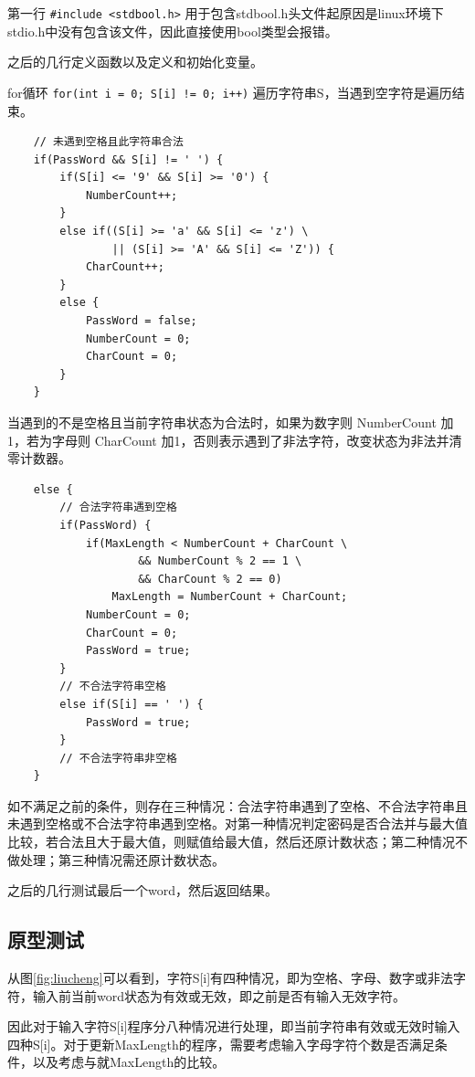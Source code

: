 \begin{spacing}{1.5}
    第一行 \lstinline{#include <stdbool.h>} 用于包含stdbool.h头文件起原因是linux环境下stdio.h中没有包含该文件，因此直接使用bool类型会报错。
    
    之后的几行定义函数以及定义和初始化变量。

    for循环 \lstinline{for(int i = 0; S[i] != 0; i++)} 遍历字符串S，当遇到空字符是遍历结束。
\begin{lstlisting}
    // 未遇到空格且此字符串合法
    if(PassWord && S[i] != ' ') {
        if(S[i] <= '9' && S[i] >= '0') {
            NumberCount++;
        }
        else if((S[i] >= 'a' && S[i] <= 'z') \
                || (S[i] >= 'A' && S[i] <= 'Z')) {
            CharCount++;
        }
        else {
            PassWord = false;
            NumberCount = 0;
            CharCount = 0;
        }
    }
\end{lstlisting}

    当遇到的不是空格且当前字符串状态为合法时，如果为数字则 NumberCount 加1，若为字母则 CharCount 加1，否则表示遇到了非法字符，改变状态为非法并清零计数器。
\begin{lstlisting}
    else {
        // 合法字符串遇到空格
        if(PassWord) {
            if(MaxLength < NumberCount + CharCount \
                    && NumberCount % 2 == 1 \
                    && CharCount % 2 == 0)
                MaxLength = NumberCount + CharCount;
            NumberCount = 0;
            CharCount = 0;
            PassWord = true;
        }
        // 不合法字符串空格
        else if(S[i] == ' ') {
            PassWord = true;
        }
        // 不合法字符串非空格
    }
\end{lstlisting}

    如不满足之前的条件，则存在三种情况：合法字符串遇到了空格、不合法字符串且未遇到空格或不合法字符串遇到空格。对第一种情况判定密码是否合法并与最大值比较，若合法且大于最大值，则赋值给最大值，然后还原计数状态；第二种情况不做处理；第三种情况需还原计数状态。

    之后的几行测试最后一个word，然后返回结果。

    \subsection{原型测试}
    从图\ref{fig:liucheng}可以看到，字符S[i]有四种情况，即为空格、字母、数字或非法字符，输入前当前word状态为有效或无效，即之前是否有输入无效字符。
    
    因此对于输入字符S[i]程序分八种情况进行处理，即当前字符串有效或无效时输入四种S[i]。对于更新MaxLength的程序，需要考虑输入字母字符个数是否满足条件，以及考虑与就MaxLength的比较。


\end{spacing}
